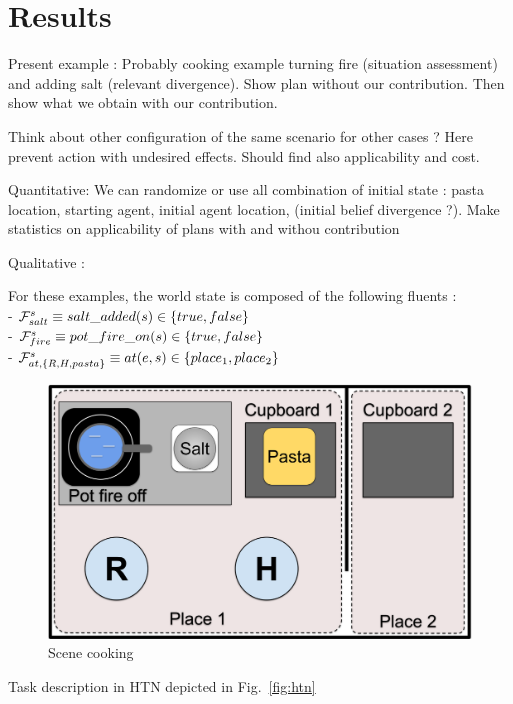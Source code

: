 \documentclass[letterpaper]{article} %
\begin{document}
\section{Results}

Present example : Probably cooking example turning fire (situation assessment) and adding salt (relevant divergence). Show plan without our contribution. Then show what we obtain with our contribution.



Think about other configuration of the same scenario for other cases ? Here prevent action with undesired effects. Should find also applicability and cost.

Quantitative: We can randomize or use all combination of initial state : pasta location, starting agent, initial agent location, (initial belief divergence ?). Make statistics on applicability of plans with and withou contribution 

Qualitative :

For these examples, the world state is composed of the following fluents :\\
- $\mathcal{F}^{s}_{salt} \equiv salt\_added(s)\in\{true, false\}$\\
- $\mathcal{F}^{s}_{fire} \equiv pot\_fire\_on(s)\in\{true, false\}$\\
- $\mathcal{F}^{s}_{at, \{R,H,pasta\} } \equiv at(e, s)\in \{place_1, place_2\}$

\begin{figure}
    \centering
    \includegraphics[width=0.8\linewidth]{figures/scene.png}
    \caption{Scene cooking}
    \label{fig:scene}
\end{figure}

Task description in HTN depicted in Fig.~\ref{fig:htn}
\end{document}
